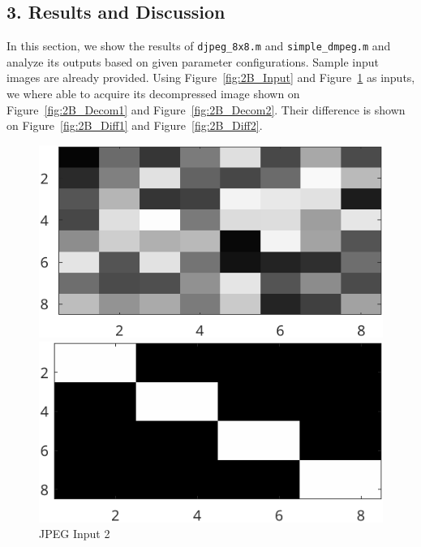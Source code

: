 \documentclass{article}
\begin{document}
	\subsection*{3. Results and Discussion}

	In this section, we show the results of {\texttt{djpeg\_8x8.m}} and {\texttt{simple\_dmpeg.m}} and analyze its outputs based on given parameter configurations. Sample input images are
	already provided. Using {Figure~\ref{fig:2B_Input}} and {Figure~\ref{fig:2B_Input2}} as inputs, we where able to acquire its decompressed image 
	shown on {Figure~\ref{fig:2B_Decom1}} and {Figure~\ref{fig:2B_Decom2}}. Their difference is shown on {Figure~\ref{fig:2B_Diff1}} and {Figure~\ref{fig:2B_Diff2}}.


	\begin{figure}[ht]
  	\centering
  	\begin{minipage}[t]{0.45\textwidth}
    	\centering
    	\includegraphics[width=\textwidth]{2B_Input}
    	\caption{JPEG Input 1}
    	\label{fig:2B_Input}
  	\end{minipage}\hfill
  	\begin{minipage}[t]{0.45\textwidth}
    	\centering
    	\includegraphics[width=\textwidth]{2B_Input2}
    	\caption{JPEG Input 2}
    	\label{fig:2B_Input2}
  	\end{minipage}
	\end{figure}
\end{document}
